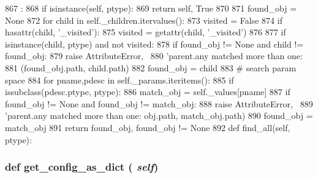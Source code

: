 \begin{DoxyCode}
867                              :
868         if isinstance(self, ptype):
869             return self, True
870 
871         found_obj = None
872         for child in self._children.itervalues():
873             visited = False
874             if hasattr(child, '_visited'):
875               visited = getattr(child, '_visited')
876 
877             if isinstance(child, ptype) and not visited:
878                 if found_obj != None and child != found_obj:
879                     raise AttributeError, \
880                           'parent.any matched more than one: %
881                           (found_obj.path, child.path)
882                 found_obj = child
883         # search param space
884         for pname,pdesc in self._params.iteritems():
885             if issubclass(pdesc.ptype, ptype):
886                 match_obj = self._values[pname]
887                 if found_obj != None and found_obj != match_obj:
888                     raise AttributeError, \
889                           'parent.any matched more than one: %
      obj.path, match_obj.path)
890                 found_obj = match_obj
891         return found_obj, found_obj != None
892 
    def find_all(self, ptype):
\end{DoxyCode}
\hypertarget{classm5_1_1SimObject_1_1SimObject_ab1772c0da7b9e12819e1c0373513c53c}{
\subsubsection[{get\_\-config\_\-as\_\-dict}]{\setlength{\rightskip}{0pt plus 5cm}def get\_\-config\_\-as\_\-dict ( {\em self})}}
\label{classm5_1_1SimObject_1_1SimObject_ab1772c0da7b9e12819e1c0373513c53c}



